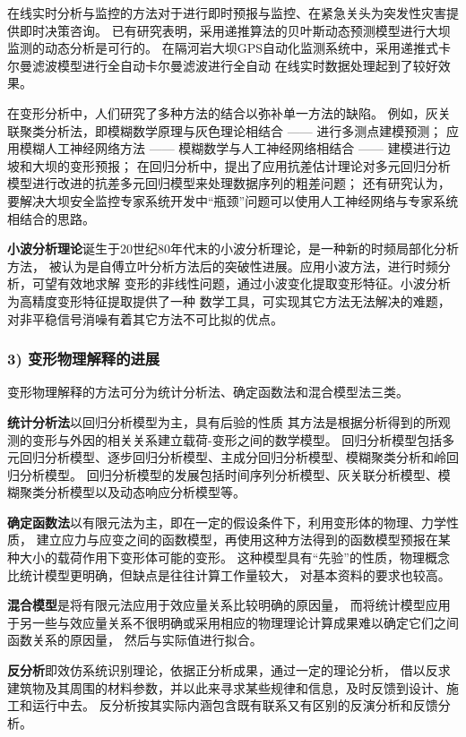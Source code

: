 在线实时分析与监控的方法对于进行即时预报与监控、在紧急关头为突发性灾害提供即时决策咨询。
已有研究表明，采用递推算法的贝叶斯动态预测模型进行大坝监测的动态分析是可行的。
在隔河岩大坝GPS自动化监测系统中，采用递推式卡尔曼滤波模型进行全自动卡尔曼滤波进行全自动
在线实时数据处理起到了较好效果。

在变形分析中，人们研究了多种方法的结合以弥补单一方法的缺陷。
例如，灰关联聚类分析法，即模糊数学原理与灰色理论相结合 —— 进行多测点建模预测；
应用模糊人工神经网络方法 —— 模糊数学与人工神经网络相结合 —— 建模进行边坡和大坝的变形预报；
在回归分析中，提出了应用抗差估计理论对多元回归分析模型进行改进的抗差多元回归模型来处理数据序列的粗差问题；
还有研究认为，要解决大坝安全监控专家系统开发中“瓶颈”问题可以使用人工神经网络与专家系统相结合的思路。

\textbf{小波分析理论}诞生于20世纪80年代末的小波分析理论，是一种新的时频局部化分析方法，
被认为是自傅立叶分析方法后的突破性进展。应用小波方法，进行时频分析，可望有效地求解
变形的非线性问题，通过小波变化提取变形特征。小波分析为高精度变形特征提取提供了一种
数学工具，可实现其它方法无法解决的难题，
对非平稳信号消噪有着其它方法不可比拟的优点。

\subsubsection*{3) 变形物理解释的进展}
变形物理解释的方法可分为统计分析法、确定函数法和混合模型法三类。

\textbf{统计分析法}以回归分析模型为主，具有后验的性质
其方法是根据分析得到的所观测的变形与外因的相关关系建立载荷-变形之间的数学模型。
回归分析模型包括多元回归分析模型、逐步回归分析模型、主成分回归分析模型、模糊聚类分析和岭回归分析模型。
回归分析模型的发展包括时间序列分析模型、灰关联分析模型、模糊聚类分析模型以及动态响应分析模型等。

\textbf{确定函数法}以有限元法为主，即在一定的假设条件下，利用变形体的物理、力学性质，
建立应力与应变之间的函数模型，再使用这种方法得到的函数模型预报在某种大小的载荷作用下变形体可能的变形。
这种模型具有“先验”的性质，物理概念比统计模型更明确，但缺点是往往计算工作量较大，
对基本资料的要求也较高。

\textbf{混合模型}是将有限元法应用于效应量关系比较明确的原因量，
而将统计模型应用于另一些与效应量关系不很明确或采用相应的物理理论计算成果难以确定它们之间函数关系的原因量，
然后与实际值进行拟合。

\textbf{反分析}即效仿系统识别理论，依据正分析成果，通过一定的理论分析，
借以反求建筑物及其周围的材料参数，并以此来寻求某些规律和信息，及时反馈到设计、施工和运行中去。
反分析按其实际内涵包含既有联系又有区别的反演分析和反馈分析。


